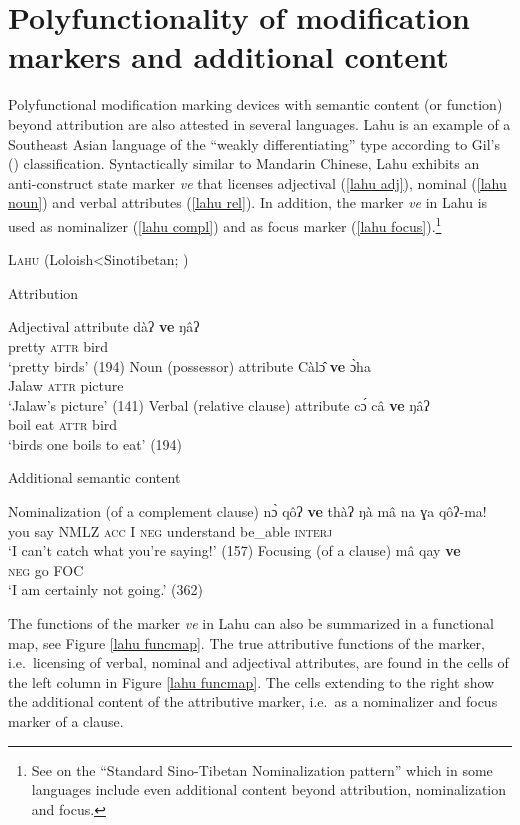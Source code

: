 \section[Polyfunctionality and additional content]{Polyfunctionality of modification markers and additional content}
Polyfunctional modification marking devices with semantic content (or function) beyond attribution are also attested in several languages. Lahu is an example of a South\-east Asian language of the “weakly differentiating” type according to Gil's (\citeyear{gil2005}) classification. Syntactically similar to Mandarin Chinese, Lahu exhibits an anti-construct state marker \textit{ve} that licenses adjectival (\ref{lahu adj}), nominal (\ref{lahu noun}) and verbal attributes (\ref{lahu rel}). In addition, the marker \textit{ve} in Lahu is used as nominalizer (\ref{lahu compl}) and as focus marker (\ref{lahu focus}).\footnote{See \citealt{bickel1999} on the “Standard Sino-Tibetan Nominalization pattern” which in some languages include even additional content beyond attribution, nominalization and focus.}
\newpage
\begin{exe}
\ex	\textsc{Lahu} (Loloish<Sinotibetan; \citealt{matisoff1973})
\begin{xlist}
\ex	Attribution
\begin{xlist}
\ex	Adjectival attribute \label{lahu adj}
\gll	dàʔ	\textbf{ve}	ŋâʔ\\
	pretty	\textsc{attr}	bird\\
\glt	‘pretty birds’ (194)
\ex	Noun (possessor) attribute \label{lahu noun}
\gll	Càl\^{ɔ}	\textbf{ve}	\`{ɔ}ha\\
	Jalaw	\textsc{attr}	picture\\
\glt	‘Jalaw's picture’ (141)
\ex	Verbal (relative clause) attribute \label{lahu rel}
\gll	c\'{ɔ}	câ	\textbf{ve}	ŋâʔ\\
	boil	eat	\textsc{attr}	bird\\
\glt	‘birds one boils to eat’ (194)
\end{xlist}
\ex	Additional semantic content
\begin{xlist}
\ex Nominalization (of a complement clause)\label{lahu compl}
\gll	n\`{ɔ}	qôʔ \textbf{ve}	thàʔ	ŋà mâ	na ɣa	qôʔ-ma!\\
	you	say \textsc{NMLZ}	\textsc{acc} I	\textsc{neg} understand	be\_able	\textsc{interj}\\
\glt	‘I can't catch what you're saying!’ (157)
\ex	Focusing (of a clause) \label{lahu focus}
\gll	mâ		qay	\textbf{ve}\\
	\textsc{neg}	go	\textsc{FOC}\\
\glt	‘I am certainly not going.’ (362)
\end{xlist}
\end{xlist}
\end{exe}
The functions of the marker \textit{ve} in Lahu can also be summarized in a functional map, see Figure \ref{lahu funcmap}. The true attributive functions of the marker, i.e.~licensing of verbal, nominal and adjectival attributes, are found in the cells of the left column in Figure \ref{lahu funcmap}. The cells extending to the right show the additional content of the attributive marker, i.e.~as a nominalizer and focus marker of a clause.

